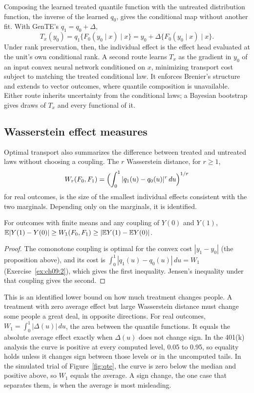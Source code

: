 Composing the learned treated quantile function with the untreated distribution function, the inverse of the learned $q_0$, gives the conditional map without another fit. With GenTE's $q_1 = q_0 + \Delta$,
\[
T_x(y_0) = q_1\{F_0(y_0 \mid x) \mid x\} = y_0 + \Delta\{F_0(y_0 \mid x) \mid x\}.
\]
Under rank preservation, then, the individual effect is the effect head evaluated at the unit's own conditional rank. A second route learns $T_x$ as the gradient in $y_0$ of an input convex neural network conditioned on $x$, minimizing transport cost subject to matching the treated conditional law. It enforces Brenier's structure and extends to vector outcomes, where quantile composition is unavailable. Either route inherits uncertainty from the conditional laws; a Bayesian bootstrap gives draws of $T_x$ and every functional of it.

\subsection{Wasserstein effect measures}

Optimal transport also summarizes the difference between treated and untreated laws without choosing a coupling. The $r$ Wasserstein distance, for $r \geq 1$,
\[
W_r(F_0, F_1) = \Bigl(\int_0^1 |q_1(u) - q_0(u)|^r\,du\Bigr)^{1/r}
\]
for real outcomes, is the size of the smallest individual effects consistent with the two marginals. Depending only on the marginals, it is identified.

\begin{proposition}
For outcomes with finite means and any coupling of $Y(0)$ and $Y(1)$, $\mathbb{E}|Y(1) - Y(0)| \geq W_1(F_0, F_1) \geq |\mathbb{E} Y(1) - \mathbb{E} Y(0)|$.
\end{proposition}

\begin{proof}
The comonotone coupling is optimal for the convex cost $|y_1 - y_0|$ (the proposition above), and its cost is $\int_0^1 |q_1(u) - q_0(u)|\,du = W_1$ (Exercise~\ref{ex:ch09:2}), which gives the first inequality. Jensen's inequality under that coupling gives the second.
\end{proof}

This is an identified lower bound on how much treatment changes people. A treatment with zero average effect but large Wasserstein distance must change some people a great deal, in opposite directions. For real outcomes, $W_1 = \int_0^1 |\Delta(u)|\,du$, the area between the quantile functions. It equals the absolute average effect exactly when $\Delta(u)$ does not change sign. In the 401(k) analysis the curve is positive at every computed level, 0.05 to 0.95, so equality holds unless it changes sign between those levels or in the uncomputed tails. In the simulated trial of Figure~\ref{fig:qte}, the curve is zero below the median and positive above, so $W_1$ equals the average. A sign change, the one case that separates them, is when the average is most misleading.

